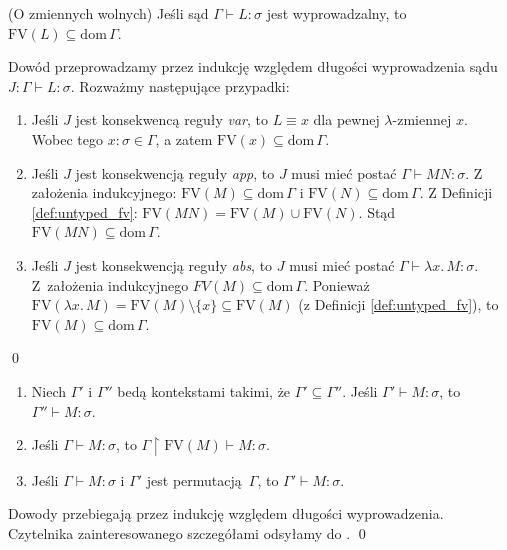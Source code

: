 \begin{lemat}(O zmiennych wolnych)\label{thm:fv}
  Jeśli sąd \(\Gamma \vdash L:\sigma\) jest wyprowadzalny, to \(\mathrm{FV}(L)\subseteq \mathrm{dom}\,\Gamma\).
\end{lemat}
\begin{dowod}
  Dowód przeprowadzamy przez indukcję względem długości wyprowadzenia sądu \(J:\Gamma \vdash L:\sigma\). Rozważmy następujące przypadki:
  \begin{enumerate}[label=(\alph*)]
    \setlength\itemsep{0em}
    \item Jeśli \(J\) jest konsekwencą reguły \emph{var}, to \(L\equiv x\) dla pewnej \(\lambda\)-zmiennej \(x\). Wobec tego \(x:\sigma\in\Gamma\), a zatem \(\mathrm{FV}(x)\subseteq\mathrm{dom}\,\Gamma\).
    \item Jeśli \(J\) jest konsekwencją reguły \emph{app}, to \(J\) musi mieć postać \(\Gamma\vdash MN:\sigma\). Z założenia indukcyjnego: \(\mathrm{FV}(M)\subseteq \mathrm{dom}\,\Gamma\) i  \(\mathrm{FV}(N)\subseteq \mathrm{dom}\,\Gamma\). Z Definicji \ref{def:untyped_fv}: \(\mathrm{FV}(MN)=\mathrm{FV}(M)\cup\mathrm{FV}(N)\). Stąd \(\mathrm{FV}(MN)\subseteq \mathrm{dom}\,\Gamma\).
    \item Jeśli \(J\) jest konsekwencją reguły \emph{abs}, to \(J\) musi mieć postać \(\Gamma\vdash \lambda x.\,M:\sigma\). Z~założenia indukcyjnego \(FV(M)\subseteq\mathrm{dom}\,\Gamma\). Ponieważ \(\mathrm{FV}(\lambda x.\,M)=\mathrm{FV}(M)\setminus\{x\}\subseteq\mathrm{FV}(M)\) (z Definicji \ref{def:untyped_fv}), to \(\mathrm{FV}(M)\subseteq\mathrm{dom}\,\Gamma\). 
  \end{enumerate}  
  \qed
\end{dowod}

\begin{lemat}\label{thm:permutation_simple}
  \begin{enumerate}[label=(\arabic*), ref=(\arabic*)]
    \setlength\itemsep{0em}
    \item Niech \(\Gamma'\) i \(\Gamma''\) bedą kontekstami takimi, że \(\Gamma' \subseteq \Gamma''\). Jeśli \(\Gamma'\vdash M:\sigma\), to \(\Gamma''\vdash M:\sigma\).\label{thm:permutation_1}
    \item Jeśli \(\Gamma\vdash M:\sigma\), to \(\Gamma \upharpoonright \mathrm{FV}(M)\vdash M:\sigma\).\label{thm:permutation_2}
    \item Jeśli \(\Gamma\vdash M:\sigma\) i \(\Gamma'\) jest permutacją \(\Gamma\), to \(\Gamma'\vdash M:\sigma\).\label{thm:permutation_3}
  \end{enumerate}
\end{lemat}
\begin{dowod}
  Dowody przebiegają przez indukcję względem długości wyprowadzenia. Czytelnika zainteresowanego szczegółami odsyłamy do \cite[Tw. 3.1.7]{Barendregt_1992}. 
  \qed
\end{dowod}

